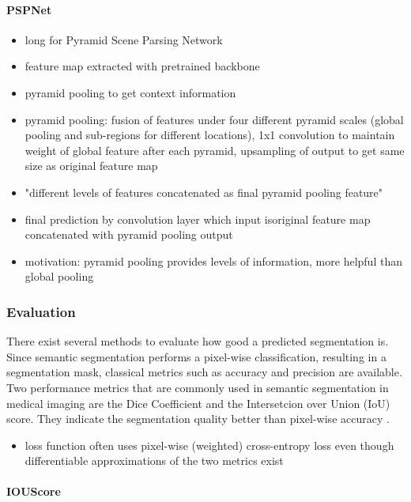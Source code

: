 \paragraph{PSPNet}

\begin{itemize}
	\item long for Pyramid Scene Parsing Network
	\item feature map extracted with pretrained backbone
	\item pyramid pooling to get context information
	\item pyramid pooling: fusion of features under four different pyramid scales (global pooling and sub-regions for different locations), 1x1 convolution to maintain weight of global feature after each pyramid, upsampling of output to get same size as original feature map
	\item "different levels of features concatenated as final pyramid pooling feature"
	\item final prediction by convolution layer which input isoriginal feature map concatenated with pyramid pooling output
	\item motivation: pyramid pooling provides levels of information, more helpful than global pooling
\end{itemize}

\subsubsection{Evaluation}

There exist several methods to evaluate how good a predicted segmentation is. Since semantic segmentation performs a pixel-wise classification, resulting in a segmentation mask, classical metrics such as accuracy and precision are available. Two performance metrics that are commonly used in semantic segmentation in medical imaging are the Dice Coefficient and the Intersetcion over Union (IoU) score. They indicate the segmentation quality better than pixel-wise accuracy \cite{Eelbode}.

\begin{itemize}
	\item loss function often uses pixel-wise (weighted) cross-entropy loss even though differentiable approximations of the two metrics exist \cite{Eelbode}
\end{itemize}

\paragraph{IOUScore}

